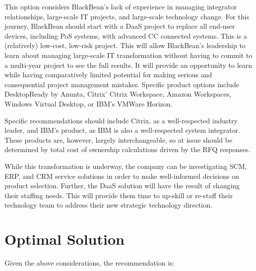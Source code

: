 This option considers BlackBean's lack of experience in managing integrator relationships, large-scale IT projects, and large-scale technology change. For this journey, BlackBean should start with a DaaS project to replace all end-user devices, including PoS systems, with advanced CC connected systems. This is a (relatively) low-cost, low-risk project. This will allow BlackBean's leadership to learn about managing large-scale IT transformation without having to commit to a multi-year project to see the full results. It will provide an opportunity to learn while having comparatively limited potential for making serious and consequential project management mistakes. Specific product options include DesktopReady by Anunta, Citrix' Citrix Workspace, Amazon Workspaces, Windows Virtual Desktop, or IBM's VMWare Horizon.

Specific recommendations should include Citrix, as a well-respected industry leader, and IBM's product, as IBM is also a well-respected system integrator. These products are, however, largely interchangeable, so at issue should be determined by total cost of ownership calculations driven by the RFQ responses.


While this transformation is underway, the company can be investigating SCM, ERP, and CRM service solutions in order to make well-informed decisions on product selection. Further, the DaaS solution will have the result of changing their staffing needs. This will provide them time to up-skill or re-staff their technology team to address their new strategic technology direction.

\section{Optimal Solution}

Given the above considerations, the recommendation is:


